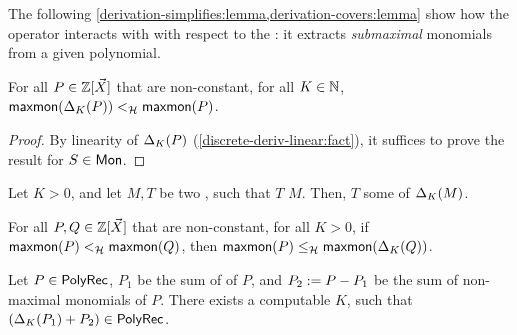 The following \cref{derivation-simplifies:lemma,derivation-covers:lemma} 
show how the  operator
interacts with  with respect to the :
it extracts \emph{submaximal} monomials from a given polynomial.

\begin{lemma}
    \label{derivation-simplifies:lemma}
    For all $P \in \mathbb{Z}[\vec{X}]$ that are non-constant,
    for all $K \in \mathbb{N}$,
    $\mathop{\mathsf{maxmon}}(\Delta_{K}(P)) <_{\mathcal{H}}
    \mathop{\mathsf{maxmon}}(P)$.
\end{lemma}
\begin{proof}
    By linearity of $\Delta_{K}(P)$ (\cref{discrete-deriv-linear:fact}), 
    it suffices to prove the result
    for  $S \in \Monomials$.
\end{proof}

\begin{fact}
    Let $K > 0$,
    and let $M,T$ be two , such that
    $T$  $M$.
    Then,
    $T$  some 
    of $\Delta_{K}(M)$.
\end{fact}

\begin{lemma}
    \label{derivation-covers:lemma}
    For all $P,Q \in \mathbb{Z}[\vec{X}]$ that are non-constant,
    for all $K > 0$,
    if $\mathop{\mathsf{maxmon}}(P) <_{\mathcal{H}} \mathop{\mathsf{maxmon}}(Q)$,
    then
    $\mathop{\mathsf{maxmon}}(P) \leq_{\mathcal{H}} \mathop{\mathsf{maxmon}}(\Delta_{K}(Q))$.
\end{lemma}


\begin{lemma}
    \label{derivation-stabilises-correct:lem}
    Let $P \in \mathsf{PolyRec}$,
    $P_1$ be the sum of  of $P$,
    and $P_2 \mathrel{:=} P - P_1$ be the sum of
    non-maximal monomials of $P$.
    There exists a computable $K$,
    such that
    $(\Delta_{K}(P_1) + P_2) \in \mathsf{PolyRec}$.
\end{lemma}


